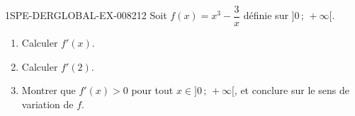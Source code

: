 \begin{exercice}{1SPE-DERGLOBAL-EX-008}{2}{12}
Soit $f(x) = x^3 - \dfrac{3}{x}$ définie sur $]0\,;\,+\infty[$.
\begin{enumerate}
  \item Calculer $f'(x)$.
  \item Calculer $f'(2)$.
  \item Montrer que $f'(x) > 0$ pour tout $x \in ]0\,;\,+\infty[$, et conclure sur le sens de variation de $f$.
\end{enumerate}
\end{exercice}
